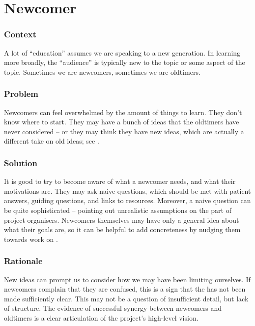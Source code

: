 

\section{Newcomer}\label{sec:Newcomer}

\subsubsection*{Context}
A lot of ``education'' assumes we are speaking to a new generation. 
In learning more broadly, the ``audience'' is typically new to the topic or some aspect of the topic.
Sometimes we are newcomers, sometimes we are oldtimers.

\subsubsection*{Problem} Newcomers can feel overwhelmed by the amount of things to learn.  They
don't know where to start.  They may have a bunch of ideas that the
oldtimers have never considered -- or they may think they have new
ideas, which are actually a different take on old ideas; see
.

\subsubsection*{Solution} It is good to try to become aware of what a
newcomer needs, and what their motivations are.  They may ask naive questions, which
should be met with patient answers, guiding questions, and links to resources.
Moreover, a naive question can be quite sophisticated -- pointing out unrealistic
assumptions on the part of project organisers.  Newcomers themselves
may have only a general idea about what their goals are, so it can be helpful to add
concreteness by nudging them towards work on .

\subsubsection*{Rationale} 
New ideas can prompt us to consider how we may have been limiting ourselves.
If newcomers complain that they are confused, this is a sign that
the  has not been made sufficiently clear.  This may not
be a question of insufficient detail, but lack of structure.  The evidence of
successful synergy between newcomers and oldtimers is a clear articulation of
the project's high-level vision.

